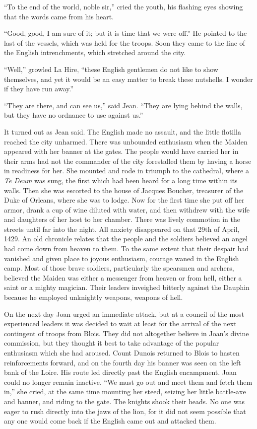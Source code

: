``To the end of the world, noble sir,'' cried the youth, his flashing
eyes showing that the words came from his heart.

``Good, good, I am sure of it; but it is time that we were off.'' He
pointed to the last of the vessels, which was held for the troops. Soon
they came to the line of the English intrenchments, which stretched
around the city.

``Well,'' growled La Hire, ``these English gentlemen do not like to show
themselves, and yet it would be an easy matter to break these nutshells.
I wonder if they have run away.''

``They are there, and can see us,'' said Jean. ``They are lying behind
the walls, but they have no ordnance to use against us.''

It turned out as Jean said. The English made no assault, and the little
flotilla reached the city unharmed. There was unbounded enthusiasm when
the Maiden appeared with her banner at the gates. The people would have
carried her in their arms had not the commander of the city forestalled
them by having a horse in readiness for her. She mounted and rode in
triumph to the cathedral, where a \emph{Te Deum} was sung, the first
which had been heard for a long time within its walls. Then she was
escorted to the house of Jacques Boucher, treasurer of the Duke of
Orleans, where she was to lodge. Now for the first time she put off her
armor, drank a cup of wine diluted with water, and then withdrew with
the wife and daughters of her host to her chamber. There was lively
commotion in the streets until far into the night. All anxiety
disappeared on that 29th of April, 1429. An old chronicle relates that
the people and the soldiers believed an angel had come down from heaven
to them. To the same extent that their despair had vanished and given
place to joyous enthusiasm, courage waned in the English camp. Most of
those brave soldiers, particularly the spearsmen and archers, believed
the Maiden was either a messenger from heaven or from hell, either a
saint or a mighty magician. Their leaders inveighed bitterly against the
Dauphin because he employed unknightly weapons, weapons of hell.

On the next day Joan urged an immediate attack, but at a council of the
most experienced leaders it was decided to wait at least for the arrival
of the next contingent of troops from Blois. They did not altogether
believe in Joan's divine commission, but they thought it best to take
advantage of the popular enthusiasm which she had aroused. Count Dunois
returned to Blois to hasten reinforcements forward, and on the fourth
day his banner was seen on the left bank of the Loire. His route led
directly past the English encampment. Joan could no longer remain
inactive. ``We must go out and meet them and fetch them in,'' she cried,
at the same time mounting her steed, seizing her little battle-axe and
banner, and riding to the gate. The knights shook their heads. No one
was eager to rush directly into the jaws of the lion, for it did not
seem possible that any one would come back if the English came out and
attacked them.

